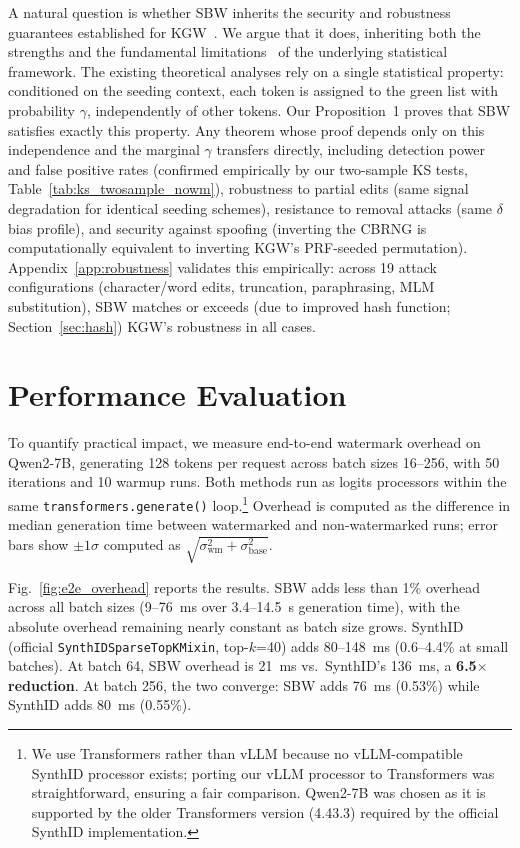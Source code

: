\documentclass[11pt]{article}
\begin{document}
A natural question is whether SBW inherits the security and robustness guarantees established for KGW~\cite{kirchenbauer2023watermark,kirchenbauer2024reliability,fernandez2023three,zhao2023provable}. We argue that it does, inheriting both the strengths and the fundamental limitations~\cite{zhang2024impossibility} of the underlying statistical framework. The existing theoretical analyses rely on a single statistical property: conditioned on the seeding context, each token is assigned to the green list with probability $\gamma$, independently of other tokens. Our Proposition~1 proves that SBW satisfies exactly this property. Any theorem whose proof depends only on this independence and the marginal $\gamma$ transfers directly, including detection power and false positive rates (confirmed empirically by our two-sample KS tests, Table~\ref{tab:ks_twosample_nowm}), robustness to partial edits (same signal degradation for identical seeding schemes), resistance to removal attacks (same $\delta$ bias profile), and security against spoofing (inverting the CBRNG is computationally equivalent to inverting KGW's PRF-seeded permutation). Appendix~\ref{app:robustness} validates this empirically: across 19 attack configurations (character/word edits, truncation, paraphrasing, MLM substitution), SBW matches or exceeds (due to improved hash function; Section~\ref{sec:hash}) KGW's robustness in all cases.

\section{Performance Evaluation}
\label{sec:scaling}

To quantify practical impact, we measure end-to-end watermark overhead on Qwen2-7B, generating 128 tokens per request across batch sizes 16--256, with 50 iterations and 10 warmup runs. Both methods run as logits processors within the same \texttt{transformers.generate()} loop.\footnote{We use Transformers rather than vLLM because no vLLM-compatible SynthID processor exists; porting our vLLM processor to Transformers was straightforward, ensuring a fair comparison. Qwen2-7B was chosen as it is supported by the older Transformers version (4.43.3) required by the official SynthID implementation.} Overhead is computed as the difference in median generation time between watermarked and non-watermarked runs; error bars show $\pm 1\sigma$ computed as $\sqrt{\sigma_{\text{wm}}^2 + \sigma_{\text{base}}^2}$.

Fig.~\ref{fig:e2e_overhead} reports the results. SBW adds less than 1\% overhead across all batch sizes (9--76~ms over 3.4--14.5~s generation time), with the absolute overhead remaining nearly constant as batch size grows. SynthID (official \texttt{SynthIDSparseTopKMixin}, top-$k$=40) adds 80--148~ms (0.6--4.4\% at small batches). At batch 64, SBW overhead is 21~ms vs.\ SynthID's 136~ms, a \textbf{6.5$\times$ reduction}. At batch 256, the two converge: SBW adds 76~ms (0.53\%) while SynthID adds 80~ms (0.55\%).
\end{document}
